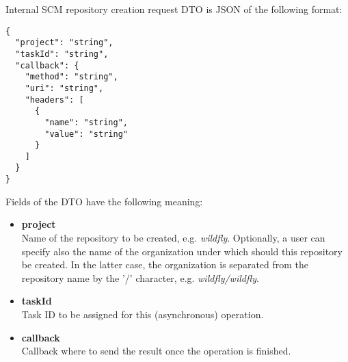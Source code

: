 \documentclass[../main.tex]{subfiles}
\begin{document}
Internal SCM repository creation request DTO is JSON of the following format:

\begin{lstlisting}[numbers=none]
{
  "project": "string",
  "taskId": "string",
  "callback": {
    "method": "string",
    "uri": "string",
    "headers": [
      {
        "name": "string",
        "value": "string"
      }
    ]
  }
}
\end{lstlisting}

Fields of the DTO have the following meaning:
\begin{itemize}
    \item \textbf{project}\\
    Name of the repository to be created, e.g. \textit{wildfly}. Optionally, a user can specify also the name of the organization under which should this repository be created. In the latter case, the organization is separated from the repository name by the '/' character, e.g. \textit{wildfly/wildfly}.

    \item \textbf{taskId}\\
    Task ID to be assigned for this (asynchronous) operation.

    \item \textbf{callback}\\
    Callback where to send the result once the operation is finished.
\end{itemize}
\end{document}
